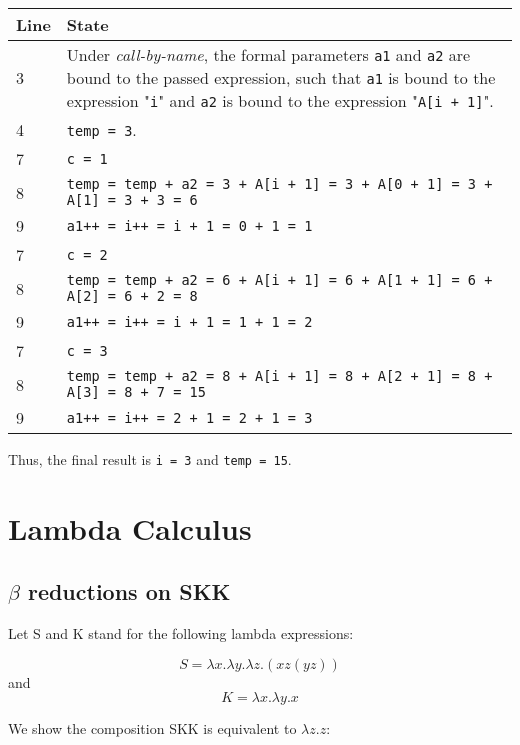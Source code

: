 \documentclass[paper=a4, fontsize=11pt]{scrartcl} %
\numberwithin{equation}{section} %
\numberwithin{figure}{section} %
\numberwithin{table}{section} %
\begin{document}
\begin{tabular}{| p{0.05\linewidth} | p{0.95\linewidth} |}
\hline
	\textbf{Line} & \textbf{State} \\
\hline
	3 & Under \emph{call-by-name}, the formal parameters \texttt{a1} and \texttt{a2} are bound to the passed expression, such that \texttt{a1} is bound to the expression "\texttt{i}" and \texttt{a2} is bound to the expression "\texttt{A[i + 1]}".\\
\hline
	4 & \texttt{temp = 3}.\\
\hline
	7 & \texttt{c = 1}\\
\hline
	8 & \texttt{temp = temp + a2 = 3 + A[i + 1] = 3 + A[0 + 1]  = 3 + A[1] = 3 + 3 = 6}\\
\hline
	9 & \texttt{a1++ = i++ = i + 1 = 0 + 1 = 1}\\
\hline
	7 & \texttt{c = 2}\\
\hline
	8 & \texttt{temp = temp + a2 = 6 + A[i + 1] = 6 + A[1 + 1]  = 6 + A[2] = 6 + 2 = 8}\\
\hline
	9 & \texttt{a1++ = i++ = i + 1 = 1 + 1 = 2}\\
\hline
	7 & \texttt{c = 3}\\
\hline
	8 & \texttt{temp = temp + a2 = 8 + A[i + 1] = 8 + A[2 + 1]  = 8 + A[3] = 8 + 7 = 15}\\
\hline
	9 & \texttt{a1++ = i++ = 2 + 1 = 2 + 1 = 3}\\
\hline
\end{tabular}

Thus, the final result is \texttt{i = 3} and \texttt{temp = 15}.


\section{Lambda Calculus}

\subsection{$\beta$ reductions on SKK}

Let S and K stand for the following lambda expressions:

\[S = \lambda x.\lambda y .\lambda z .(xz(yz))\]
and
\[K = \lambda x .\lambda y.x\]

We show the composition SKK is equivalent to $\lambda z.z$:
\end{document}
